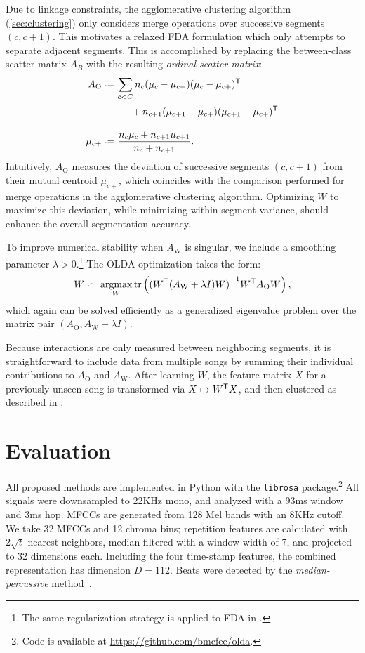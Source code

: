 \documentclass{article}
\begin{document}
Due to linkage constraints, the agglomerative clustering algorithm (\cref{sec:clustering}) only considers merge 
operations over successive segments $(c, c+1)$. This motivates a relaxed FDA formulation which only attempts to separate adjacent
segments.  This is accomplished by replacing the between-class scatter matrix $A_B$ with the resulting \emph{ordinal scatter matrix}:
\begin{align*}
A_\text{O} &\defeq \sum_{c < C} n_c (\mu_c - \mu_{c+}) (\mu_c - \mu_{c+})\trans\\
            &\phantom{\defeq \sum_{c < C}} + n_{c+1} (\mu_{c+1} - \mu_{c+}) (\mu_{c+1} - \mu_{c+})\trans\\
\mu_{c+} &\defeq \frac{n_c \mu_c + n_{c+1} \mu_{c+1} }{n_c + n_{c+1}}.
\end{align*}
Intuitively, $A_\text{O}$ measures the deviation of successive segments $(c, c+1)$ from their mutual centroid $\mu_{c+}$, 
which coincides with the comparison performed for merge operations in the agglomerative clustering algorithm.
Optimizing $W$ to maximize this deviation, while minimizing within-segment variance, should enhance the overall segmentation accuracy.  

To improve numerical stability when $A_\text{W}$ is singular, we include a smoothing parameter
$\lambda > 0$.\footnote{The same regularization strategy is applied to FDA in .} 
The OLDA optimization takes the form:
\begin{equation}
W \defeq \argmax_W \trace\left( {(W\trans (A_\text{W} + \lambda I) W)}^{-1} W\trans A_\text{O} W \right) \label{eq:olda},
\end{equation}
which again can be solved efficiently as a generalized eigenvalue problem over the matrix pair 
$(A_\text{O}, A_\text{W} + \lambda I)$.

Because interactions are only measured between neighboring segments, it is 
straightforward to include data from multiple songs by summing their individual contributions to $A_\text{O}$ and $A_\text{W}$.
After learning $W$, the feature matrix $X$ for a previously unseen song is transformed via $X \mapsto W^\mathsf{T} X$, and then 
clustered as described in .

\section{Evaluation}
\label{sec:eval}
All proposed methods are implemented in Python with the \texttt{librosa} package.\footnote{Code is
available at \url{https://github.com/bmcfee/olda}.}  
All signals were downsampled to 22KHz mono, and analyzed with a 93ms window and 3ms hop.  MFCCs are generated from 128 Mel bands
with an 8KHz cutoff. We take 32 MFCCs and 12 chroma bins; repetition features are calculated with $2\sqrt{t}$ nearest neighbors,
median-filtered with a window width of 7, and projected to 32 dimensions each.  Including the four time-stamp features, the combined
representation has dimension $D=112$. Beats were detected by the \emph{median-percussive} method~\cite{mcfee2014beat}.
\end{document}
